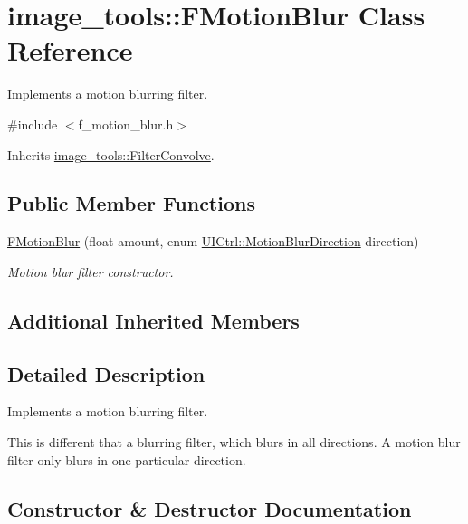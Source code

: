 \hypertarget{classimage__tools_1_1FMotionBlur}{}\section{image\+\_\+tools\+:\+:F\+Motion\+Blur Class Reference}
\label{classimage__tools_1_1FMotionBlur}


Implements a motion blurring filter.  




{\ttfamily \#include $<$f\+\_\+motion\+\_\+blur.\+h$>$}



Inherits \hyperlink{classimage__tools_1_1FilterConvolve}{image\+\_\+tools\+::\+Filter\+Convolve}.

\subsection*{Public Member Functions}
\begin{DoxyCompactItemize}
\item 
\hyperlink{classimage__tools_1_1FMotionBlur_a1cb472dcd0a7d2a26fb81fbeeccb78c1}{F\+Motion\+Blur} (float amount, enum \hyperlink{classimage__tools_1_1UICtrl_a56d4f68bf91302769d7bc453d8d57cee}{U\+I\+Ctrl\+::\+Motion\+Blur\+Direction} direction)
\begin{DoxyCompactList}\small\item\em Motion blur filter constructor. \end{DoxyCompactList}\end{DoxyCompactItemize}
\subsection*{Additional Inherited Members}


\subsection{Detailed Description}
Implements a motion blurring filter. 

This is different that a blurring filter, which blurs in all directions. A motion blur filter only blurs in one particular direction. 

\subsection{Constructor \& Destructor Documentation}
